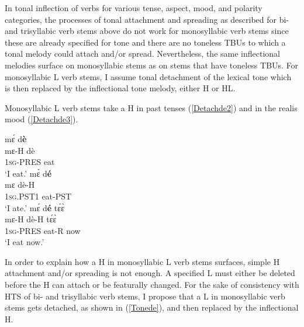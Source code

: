 In tonal inflection of verbs for various tense, aspect, mood, and polarity categories, the processes of tonal attachment and spreading as described for bi- and trisyllabic verb stems above do not work for monosyllabic verb stems since these are already specified for tone and there are no toneless TBUs to which a tonal melody could attach and/or spread. Nevertheless, the same inflectional melodies surface on monosyllabic stems as on stems that have toneless TBUs. For monosyllabic L verb stems, I assume tonal detachment of the lexical tone which is then replaced by the inflectional tone melody, either H or HL.
 
Monosyllabic L verb stems take a H in past tenses (\ref{Detachde2})  and in the realis mood (\ref{Detachde3}).


\begin{exe} 
\ex\label{Detachde}
\begin{xlist}
\ex\label{Detachde1} 
  \glll     mɛ́ d{\bfseries è} \\
	mɛ-H dè \\	
            1\textsc{sg}-PRES eat     \\
    \trans `I eat.'
\ex\label{Detachde2}
  \glll    mɛ̀ d{\bfseries é} \\
	mɛ dè-H \\	
            1\textsc{sg}.PST1 eat-PST     \\
    \trans `I ate.'
\ex\label{Detachde3} 
  \glll     mɛ́ d{\bfseries é} tɛ́ɛ̀ \\
	mɛ-H dè-H tɛ́ɛ̀ \\	
            1\textsc{sg}-PRES eat-R now     \\
    \trans `I eat now.'
\end{xlist}
\end{exe}

In order to explain how a H in monosyllabic L verb stems surfaces, simple H attachment and/or spreading is not enough. A specified L must either be deleted before the H can attach or be featurally changed. For the sake of consistency with HTS of bi- and trisyllabic verb stems, I propose that a L in monosyllabic verb stems gets detached, as shown in (\ref{Tonede}), and then replaced by the inflectional H.


